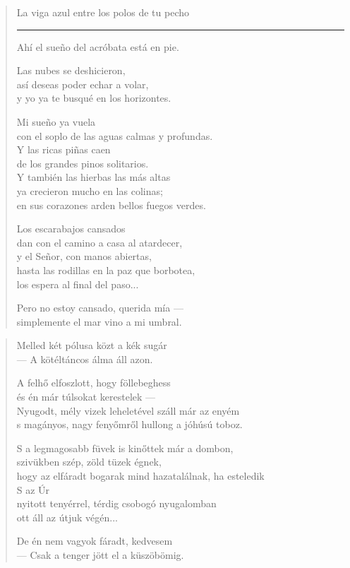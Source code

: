 \documentclass[11pt]{extbook}
\newcommand*{\centeredornament}{\centerline{\pgfornament[width=6cm]{88}}}
\begin{document}
\begin{verse}
  La viga azul entre los polos de tu pecho \\
  \rule[0.2em]{3em}{0.5pt} Ahí el sueño del acróbata está en pie.\hspace*{-1mm}

  Las nubes se deshicieron, \\
  así deseas poder echar a volar, \\
  y yo ya te busqué en los horizontes.

  Mi sueño ya vuela \\
  con el soplo de las aguas calmas y profundas. \\
  Y las ricas piñas caen \\
  de los grandes pinos solitarios. \\
  Y también las hierbas las más altas \\
  ya crecieron mucho en las colinas; \\
  en sus corazones arden bellos fuegos verdes.

  Los escarabajos cansados \\
  dan con el camino a casa al atardecer, \\
  y el Señor, con manos abiertas, \\
  hasta las rodillas en la paz que borbotea, \\
  los espera al final del paso...

  Pero no estoy cansado, querida mía --- \\
  simplemente el mar vino a mi umbral.
\end{verse}

\newpage

\vspace*{-15mm}
\centeredornament



\begin{verse}
  Melled két pólusa közt a kék sugár \\
  --- A kötéltáncos álma áll azon.

  A felhő elfoszlott, hogy föllebeghess \\
  és én már túlsokat kerestelek --- \\
  Nyugodt, mély vizek leheletével száll már az enyém \\
  s magányos, nagy fenyőmről hullong a jóhúsú toboz.

  S a legmagosabb füvek is kinőttek már a dombon, \\
  szivükben szép, zöld tüzek égnek, \\
  hogy az elfáradt bogarak mind hazatalálnak, ha esteledik \\
  S az Úr \\
  nyitott tenyérrel, térdig csobogó nyugalomban \\
  ott áll az útjuk végén...

  De én nem vagyok fáradt, kedvesem \\
  --- Csak a tenger jött el a küszöbömig.
\end{verse}
\end{document}
